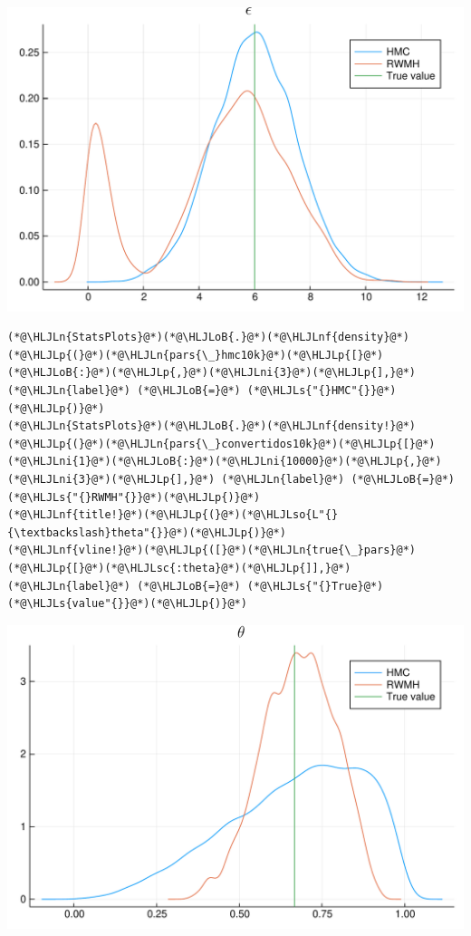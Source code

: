 \documentclass[12pt,a4paper]{article}
\newcommand{\HLJLn}[1]{#1}
\newcommand{\HLJLnf}[1]{\textcolor[RGB]{66,102,213}{#1}}
\newcommand{\HLJLs}[1]{\textcolor[RGB]{201,61,57}{#1}}
\newcommand{\HLJLsc}[1]{\textcolor[RGB]{201,61,57}{#1}}
\newcommand{\HLJLso}[1]{\textcolor[RGB]{201,61,57}{#1}}
\newcommand{\HLJLni}[1]{\textcolor[RGB]{59,151,46}{#1}}
\newcommand{\HLJLoB}[1]{\textcolor[RGB]{102,102,102}{\textbf{#1}}}
\newcommand{\HLJLp}[1]{#1}
\begin{document}
\includegraphics[width=\linewidth]{figures/dsge_and_julia_54_1.pdf}

\begin{lstlisting}
(*@\HLJLn{StatsPlots}@*)(*@\HLJLoB{.}@*)(*@\HLJLnf{density}@*)(*@\HLJLp{(}@*)(*@\HLJLn{pars{\_}hmc10k}@*)(*@\HLJLp{[}@*)(*@\HLJLoB{:}@*)(*@\HLJLp{,}@*)(*@\HLJLni{3}@*)(*@\HLJLp{],}@*) (*@\HLJLn{label}@*) (*@\HLJLoB{=}@*) (*@\HLJLs{"{}HMC"{}}@*)(*@\HLJLp{)}@*)
(*@\HLJLn{StatsPlots}@*)(*@\HLJLoB{.}@*)(*@\HLJLnf{density!}@*)(*@\HLJLp{(}@*)(*@\HLJLn{pars{\_}convertidos10k}@*)(*@\HLJLp{[}@*)(*@\HLJLni{1}@*)(*@\HLJLoB{:}@*)(*@\HLJLni{10000}@*)(*@\HLJLp{,}@*)(*@\HLJLni{3}@*)(*@\HLJLp{],}@*) (*@\HLJLn{label}@*) (*@\HLJLoB{=}@*) (*@\HLJLs{"{}RWMH"{}}@*)(*@\HLJLp{)}@*)
(*@\HLJLnf{title!}@*)(*@\HLJLp{(}@*)(*@\HLJLso{L"{}{\textbackslash}theta"{}}@*)(*@\HLJLp{)}@*)
(*@\HLJLnf{vline!}@*)(*@\HLJLp{([}@*)(*@\HLJLn{true{\_}pars}@*)(*@\HLJLp{[}@*)(*@\HLJLsc{:theta}@*)(*@\HLJLp{]],}@*) (*@\HLJLn{label}@*) (*@\HLJLoB{=}@*) (*@\HLJLs{"{}True}@*) (*@\HLJLs{value"{}}@*)(*@\HLJLp{)}@*)
\end{lstlisting}

\includegraphics[width=\linewidth]{figures/dsge_and_julia_55_1.pdf}
\end{document}
